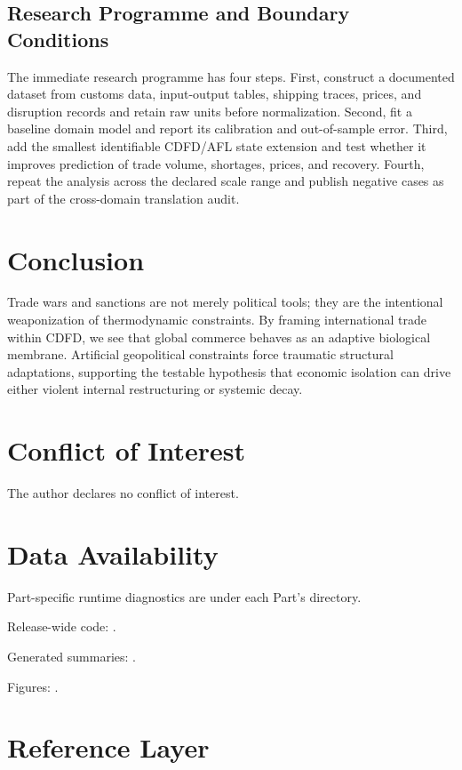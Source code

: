 \documentclass[11pt,a4paper]{article}
\begin{document}
\subsection{Research Programme and Boundary Conditions}

The immediate research programme has four steps. First, construct a documented
dataset from customs data, input-output tables, shipping traces, prices, and disruption records and retain raw units before normalization.
Second, fit a baseline domain model and report its calibration and out-of-sample
error. Third, add the smallest identifiable CDFD/AFL state extension and test
whether it improves prediction of trade volume, shortages, prices, and recovery. Fourth, repeat the
analysis across the declared scale range and publish negative cases as part of
the cross-domain translation audit.


\section{Conclusion}
Trade wars and sanctions are not merely political tools; they are the intentional weaponization of thermodynamic constraints. By framing international trade within CDFD, we see that global commerce behaves as an adaptive biological membrane. Artificial geopolitical constraints force traumatic structural adaptations, supporting the testable hypothesis that economic isolation can drive either violent internal restructuring or systemic decay.
\section*{Conflict of Interest} The author declares no conflict of interest.
\section*{Data Availability}
Part-specific runtime diagnostics are under each Part's  directory.

Release-wide code: .

Generated summaries: .

Figures: .


\section{Reference Layer}


\end{document}
